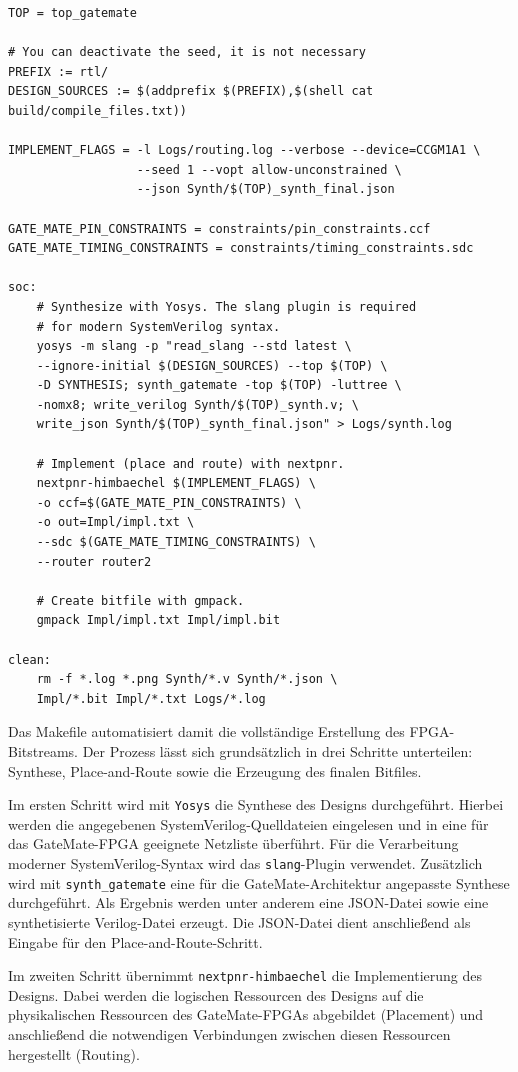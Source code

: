 \documentclass[a4paper,11pt]{article}
\begin{document}
\begin{verbatim}
TOP = top_gatemate

# You can deactivate the seed, it is not necessary
PREFIX := rtl/
DESIGN_SOURCES := $(addprefix $(PREFIX),$(shell cat build/compile_files.txt))

IMPLEMENT_FLAGS = -l Logs/routing.log --verbose --device=CCGM1A1 \
                  --seed 1 --vopt allow-unconstrained \
                  --json Synth/$(TOP)_synth_final.json

GATE_MATE_PIN_CONSTRAINTS = constraints/pin_constraints.ccf
GATE_MATE_TIMING_CONSTRAINTS = constraints/timing_constraints.sdc

soc:
	# Synthesize with Yosys. The slang plugin is required
	# for modern SystemVerilog syntax.
	yosys -m slang -p "read_slang --std latest \
	--ignore-initial $(DESIGN_SOURCES) --top $(TOP) \
	-D SYNTHESIS; synth_gatemate -top $(TOP) -luttree \
	-nomx8; write_verilog Synth/$(TOP)_synth.v; \
	write_json Synth/$(TOP)_synth_final.json" > Logs/synth.log

	# Implement (place and route) with nextpnr.
	nextpnr-himbaechel $(IMPLEMENT_FLAGS) \
	-o ccf=$(GATE_MATE_PIN_CONSTRAINTS) \
	-o out=Impl/impl.txt \
	--sdc $(GATE_MATE_TIMING_CONSTRAINTS) \
	--router router2

	# Create bitfile with gmpack.
	gmpack Impl/impl.txt Impl/impl.bit

clean:
	rm -f *.log *.png Synth/*.v Synth/*.json \
	Impl/*.bit Impl/*.txt Logs/*.log
\end{verbatim}

Das Makefile automatisiert damit die vollständige Erstellung des FPGA-Bitstreams. Der Prozess lässt sich grundsätzlich in drei Schritte unterteilen: Synthese, Place-and-Route sowie die Erzeugung des finalen Bitfiles.

Im ersten Schritt wird mit \texttt{Yosys} die Synthese des Designs durchgeführt. Hierbei werden die angegebenen SystemVerilog-Quelldateien eingelesen und in eine für das GateMate-FPGA geeignete Netzliste überführt. Für die Verarbeitung moderner SystemVerilog-Syntax wird das \texttt{slang}-Plugin verwendet. Zusätzlich wird mit \texttt{synth\_gatemate} eine für die GateMate-Architektur angepasste Synthese durchgeführt. Als Ergebnis werden unter anderem eine JSON-Datei sowie eine synthetisierte Verilog-Datei erzeugt. Die JSON-Datei dient anschließend als Eingabe für den Place-and-Route-Schritt.

Im zweiten Schritt übernimmt \texttt{nextpnr-himbaechel} die Implementierung des Designs. Dabei werden die logischen Ressourcen des Designs auf die physikalischen Ressourcen des GateMate-FPGAs abgebildet (Placement) und anschließend die notwendigen Verbindungen zwischen diesen Ressourcen hergestellt (Routing).
\end{document}
